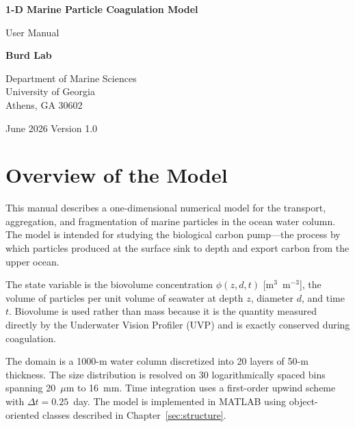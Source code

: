 \documentclass[12pt,a4paper]{report}
\numberwithin{equation}{chapter}
\begin{document}
\begin{titlepage}
\centering
\vspace*{3cm}
{\LARGE\bfseries 1-D Marine Particle Coagulation Model\par}
\vspace{1.2cm}
{\large User Manual\par}
\vspace{4cm}
{\normalsize\bfseries Burd Lab\par}
\vspace{0.4cm}
{\normalsize Department of Marine Sciences\\[2pt]
University of Georgia\\[2pt]
Athens, GA 30602\par}
\vfill
{\normalsize June 2026 \quad Version 1.0\par}
\end{titlepage}

\tableofcontents
\clearpage

\chapter{Overview of the Model}

This manual describes a one-dimensional numerical model for the transport,
aggregation, and fragmentation of marine particles in the ocean water column.
The model is intended for studying the biological carbon pump---the process by
which particles produced at the surface sink to depth and export carbon from
the upper ocean.

The state variable is the biovolume concentration $\phi(z, d, t)$
[m$^3$~m$^{-3}$], the volume of particles per unit volume of seawater at
depth $z$, diameter $d$, and time $t$. Biovolume is used rather than mass
because it is the quantity measured directly by the Underwater Vision Profiler
(UVP) and is exactly conserved during coagulation.

The domain is a 1000-m water column discretized into 20 layers of 50-m
thickness. The size distribution is resolved on 30 logarithmically spaced
bins spanning 20~$\mu$m to 16~mm. Time integration uses a first-order upwind
scheme with $\Delta t = 0.25$~day. The model is implemented in MATLAB using
object-oriented classes described in Chapter~\ref{sec:structure}.
\end{document}
